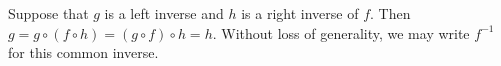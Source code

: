 Suppose that $g$ is a left inverse and $h$ is a right inverse of $f$.
Then $g = g \circ (f \circ h) = (g \circ f) \circ h = h$.
Without loss of generality, we may write $f^{-1}$ for this common inverse.